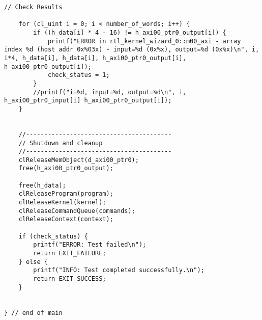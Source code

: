 \begin{lstlisting}[label=lst:code_1,caption=Содержимое файла host\_example.cpp]
	// Check Results
	
	for (cl_uint i = 0; i < number_of_words; i++) {
		if ((h_data[i] * 4 - 16) != h_axi00_ptr0_output[i]) {
			printf("ERROR in rtl_kernel_wizard_0::m00_axi - array index %d (host addr 0x%03x) - input=%d (0x%x), output=%d (0x%x)\n", i, i*4, h_data[i], h_data[i], h_axi00_ptr0_output[i], h_axi00_ptr0_output[i]);
			check_status = 1;
		}
		//printf("i=%d, input=%d, output=%d\n", i,  h_axi00_ptr0_input[i] h_axi00_ptr0_output[i]);
	}
	
	
	//----------------------------------------
	// Shutdown and cleanup
	//----------------------------------------
	clReleaseMemObject(d_axi00_ptr0);
	free(h_axi00_ptr0_output);
	
	free(h_data);
	clReleaseProgram(program);
	clReleaseKernel(kernel);
	clReleaseCommandQueue(commands);
	clReleaseContext(context);
	
	if (check_status) {
		printf("ERROR: Test failed\n");
		return EXIT_FAILURE;
	} else {
		printf("INFO: Test completed successfully.\n");
		return EXIT_SUCCESS;
	}
	
	
} // end of main
	
\end{lstlisting}
